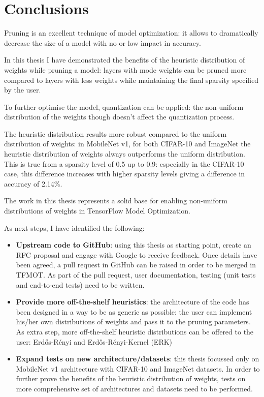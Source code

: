 \chapter{Conclusions}
Pruning is an excellent technique of model optimization: it allows to
dramatically decrease the size of a model with no or low impact in accuracy.

In this thesis I have demonstrated the benefits of the heuristic distribution
of weights while pruning a model: layers with mode weights can be pruned more
compared to layers with less weights while maintaining the final sparsity
specified by the user.

To further optimise the model, quantization can be applied: the non-uniform
distribution of the weights though doesn't affect the quantization process.

The heuristic distribution results more robust compared to the uniform
distribution of weights: in MobileNet v1, for both CIFAR-10 and ImageNet the
heuristic distribution of weights always outperforms the uniform distribution.
This is true from a sparsity level of 0.5 up to 0.9: especially in the CIFAR-10
case, this difference increases with higher sparsity levels giving a difference
in accuracy of 2.14\%.

The work in this thesis represents a solid base for enabling non-uniform
distributions of weights in TensorFlow Model Optimization.

As next steps, I have identified the following:

\begin{itemize}
    \item \textbf{Upstream code to GitHub}: using this thesis as starting
        point, create an RFC proposal and engage with Google to receive
        feedback. Once details have been agreed, a pull request in GitHub
        can be raised in order to be merged in TFMOT\@.
        As part of the pull request, user documentation, testing (unit tests
        and end-to-end tests) need to be written.
    \item \textbf{Provide more off-the-shelf heuristics}: the architecture of
        the code has been designed in a way to be as generic as possible: the
        user can implement his/her own distributions of weights and pass
        it to the pruning parameters.
        As extra step, more off-the-shelf heuristic distributions can be
        offered to the user: Erd\H{o}s-R\'{e}nyi and Erd\H{o}s-R\'{e}nyi-Kernel
        (ERK)\cite{rigl}
    \item \textbf{Expand tests on new architecture/datasets}: this thesis
        focussed only on MobileNet v1 architecture with CIFAR-10 and ImageNet
        datasets. In order to further prove the benefits of the heuristic
        distribution of weights, tests on more comprehensive set of
        architectures and datasets need to be performed.
\end{itemize}
